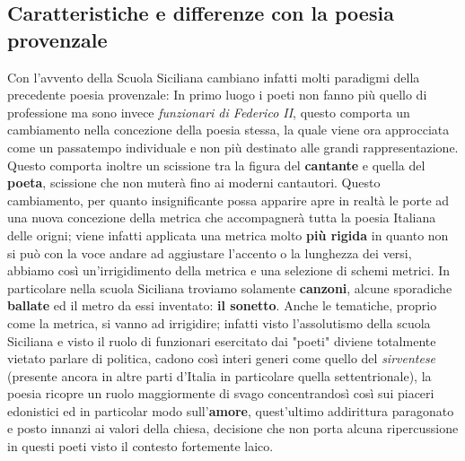 \documentclass[a4paper, 11pt]{article}
\begin{document}
\subsection{Caratteristiche e differenze con la poesia provenzale}
Con l'avvento della Scuola Siciliana cambiano infatti molti paradigmi della precedente poesia provenzale:
In primo luogo i poeti non fanno più quello di professione ma sono invece \textit{funzionari di Federico II}, questo comporta un cambiamento nella concezione della poesia stessa, la quale viene ora approcciata come un passatempo individuale e non più destinato alle grandi rappresentazione. Questo comporta inoltre un scissione tra la figura del \textbf{cantante} e quella del \textbf{poeta}, scissione che non muterà fino ai moderni cantautori. Questo cambiamento, per quanto insignificante possa apparire apre in realtà le porte ad una nuova concezione della metrica che accompagnerà tutta la poesia Italiana delle origni; viene infatti applicata una metrica molto \textbf{più rigida} in quanto non si può con la voce andare ad aggiustare l'accento o la lunghezza dei versi, abbiamo così un'irrigidimento della metrica e una selezione di schemi metrici. In particolare nella scuola Siciliana troviamo solamente \textbf{canzoni}, alcune sporadiche \textbf{ballate} ed il metro da essi inventato: \textbf{il sonetto}. Anche le tematiche, proprio come la metrica, si vanno ad irrigidire; infatti visto l'assolutismo della scuola Siciliana e visto il ruolo di funzionari esercitato dai "poeti" diviene totalmente vietato parlare di politica, cadono così interi generi come quello del \textit{sirventese} (presente ancora in altre parti d'Italia in particolare quella settentrionale), la poesia ricopre un ruolo maggiormente di svago concentrandosì così sui piaceri edonistici ed in particolar modo sull'\textbf{amore}, quest'ultimo addirittura paragonato e posto innanzi ai valori della chiesa, decisione che non porta alcuna ripercussione in questi poeti visto il contesto fortemente laico. 
\end{document}
